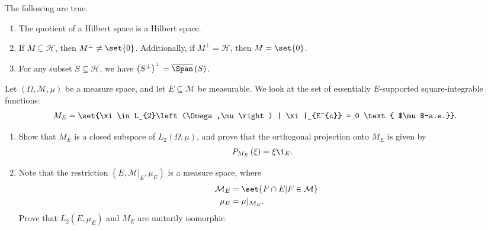 \documentclass[10pt]{mypackage}
\begin{document}
\begin{corollary}
  The following are true.
  \begin{enumerate}[(1)]
    \item The quotient of a Hilbert space is a Hilbert space.
    \item If $M\subsetneq \mathcal{H}$, then $M^{\perp}\neq \set{0}$. Additionally, if $M^{\perp} = \mathcal{H}$, then $M = \set{0}$.
    \item For any subset $S\subseteq \mathcal{H}$, we have $\left(S^{\perp}\right)^{\perp} = \overline{\Span}\left(S\right)$.
  \end{enumerate}
\end{corollary}
\begin{exercise}
  Let $\left(\Omega,\mathcal{M},\mu\right)$ be a measure space, and let $E\subseteq \mathcal{M}$ be measurable. We look at the set of essentially $E$-supported square-integrable functions:
  \begin{align*}
  M_{E} &= \set{\xi\in L_{2}\left(\Omega,\mu\right) | \xi|_{E^{c}} = 0 \text{ $\mu$-a.e.}}.
  \end{align*}
  \begin{enumerate}[(1)]
    \item Show that $M_{E}$ is a closed subspace of $L_{2}\left(\Omega,\mu\right)$, and prove that the orthogonal projection onto $M_{E}$ is given by
      \begin{align*}
        P_{M_E}\left(\xi\right) &= \xi \1_{E}.
      \end{align*}
    \item Note that the restriction $\left(E,\mathcal{M}|_{E},\mu_{E}\right)$ is a measure space, where
      \begin{align*}
        \mathcal{M}_E &= \set{F\cap E | F\in \mathcal{M}}\\
        \mu_{E} &= \mu|_{\mathcal{M}_E}.
      \end{align*}
      Prove that $L_{2}\left(E,\mu_E\right)$ and $M_{E}$ are unitarily isomorphic.
  \end{enumerate}
\end{exercise}
\end{document}
